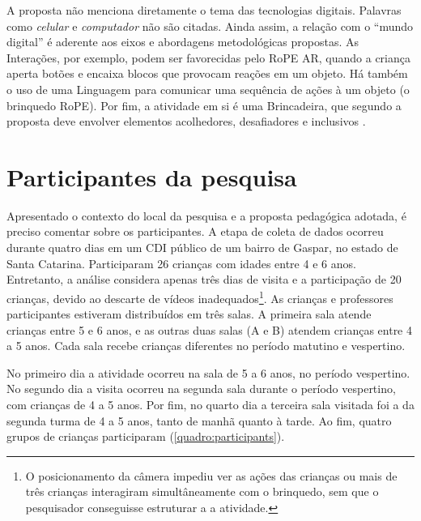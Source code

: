 A proposta não menciona diretamente o tema das tecnologias digitais. Palavras como \textit{celular} e \textit{computador} não são citadas. Ainda assim, a relação com o “mundo digital” é aderente aos eixos e abordagens metodológicas propostas. As Interações, por exemplo, podem ser favorecidas pelo RoPE AR, quando a criança aperta botões e encaixa blocos que provocam reações em um objeto. Há também o uso de uma Linguagem para comunicar uma sequência de ações à um objeto (o brinquedo RoPE). Por fim, a atividade em si é uma Brincadeira, que segundo a proposta deve envolver elementos acolhedores, desafiadores e inclusivos \cite[p.50]{gaspar_proposta_2010}. 


\section{Participantes da pesquisa}
\label{sec:participantes}
Apresentado o contexto do local da pesquisa e a proposta pedagógica adotada, é preciso comentar sobre os participantes. A etapa de coleta de dados ocorreu durante quatro dias em um CDI público de um bairro de Gaspar, no estado de Santa Catarina. Participaram 26 crianças com idades entre 4 e 6 anos. Entretanto, a análise considera apenas três dias de visita e a participação de 20 crianças, devido ao descarte de vídeos inadequados\footnote{O posicionamento da câmera impediu ver as ações das crianças ou mais de três crianças interagiram simultâneamente com o brinquedo, sem que o pesquisador conseguisse estruturar a a atividade.}. As crianças e professores participantes estiveram distribuídos em três salas. A primeira sala atende crianças entre 5 e 6 anos, e as outras duas salas (A e B) atendem crianças entre 4 a 5 anos. Cada sala recebe crianças diferentes no período matutino e vespertino.

No primeiro dia a atividade ocorreu na sala de 5 a 6 anos, no período vespertino. No segundo dia a visita ocorreu na segunda sala durante o período vespertino, com crianças de 4 a 5 anos. Por fim, no quarto dia a terceira sala visitada foi a da segunda turma de 4 a 5 anos, tanto de manhã quanto à tarde. Ao fim, quatro grupos de crianças participaram (\autoref{quadro:participants}).

